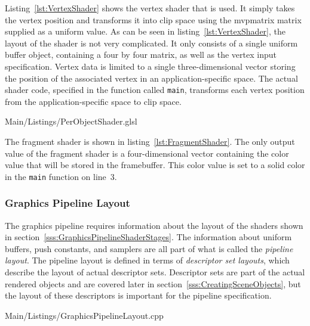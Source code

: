         Listing~\ref{lst:VertexShader} shows the vertex shader that is used.
        It simply takes the vertex position and transforms it into clip space using the \gls{mvpmatrix} matrix supplied as a uniform value.
        As can be seen in listing~\ref{lst:VertexShader}, the layout of the shader is not very complicated.
        It only consists of a single uniform buffer object, containing a four by four matrix, as well as the vertex input specification.
        Vertex data is limited to a single three-dimensional vector storing the position of the associated vertex in an application-specific space.
        The actual shader code, specified in the function called \lstinline{main}, transforms each vertex position from the application-specific space to clip space.

        
        {Main/Listings/PerObjectShader.glsl}

        The fragment shader is shown in listing~\ref{lst:FragmentShader}.
        The only output value of the fragment shader is a four-dimensional vector containing the color value that will be stored in the framebuffer.
        This color value is set to a solid color in the \lstinline{main} function on line~3.

      \subsubsection{Graphics Pipeline Layout}
      \label{sss:GraphicsPipelineLayout}
        The graphics pipeline requires information about the layout of the shaders shown in section~\ref{sss:GraphicsPipelineShaderStages}.
        The information about uniform buffers, push constants, and samplers are all part of what is called the \textit{pipeline layout}.
        The pipeline layout is defined in terms of \textit{descriptor set layouts}, which describe the layout of actual descriptor sets.
        Descriptor sets are part of the actual rendered objects and are covered later in section~\ref{sss:CreatingSceneObjects}, but the layout of these descriptors is important for the pipeline specification.

        
        {Main/Listings/GraphicsPipelineLayout.cpp}


